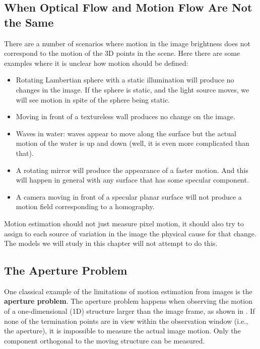 \subsection{When Optical Flow and Motion Flow Are Not the Same}

There are a number of scenarios where motion in the image brightness does not correspond to the motion of the 3D points in the scene. Here there are some examples where it is unclear how motion should be defined:

\begin{itemize}
    \item Rotating Lambertian sphere with a static illumination will produce no changes in the image. If the sphere is static, and the light source moves, we will see motion in spite of the sphere being static.

    \item Moving in front of a textureless wall produces no change on the image.

    \item Waves in water: waves appear to move along the surface but the actual motion of the water is up and down (well, it is even more complicated than that).

    \item A rotating mirror will produce the appearance of a faster motion. And this will happen in general with any surface that has some specular component.

    \item A camera moving in front of a specular planar surface will not produce a motion field corresponding to a homography.
\end{itemize}

Motion estimation should not just measure pixel motion, it should also try to assign to each source of variation in the image the physical cause for that change. The models we will study in this chapter will not attempt to do this.

\subsection{The Aperture Problem}

One classical example of the limitations of motion estimation from images is the {\bf aperture problem}. 
The aperture problem happens when observing the motion of a one-dimensional (1D) structure larger than the image frame, as shown in \fig{\ref{fig:apperture_problem}}. If none of the termination points are in view within the observation window (i.e., the aperture), it is impossible to measure the actual image motion. Only the component orthogonal to the moving structure can be measured.


